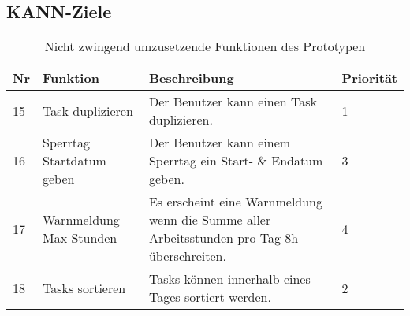 \subsection{KANN-Ziele}
\begin{table}[!ht]
\begin{center}
    \begin{tabular}{llp{6cm}l}
        \toprule Nr & Funktion & Beschreibung & Priorität \\
        \midrule 15 & Task duplizieren & Der Benutzer kann einen Task duplizieren. & 1\\
        \midrule 16 & Sperrtag Startdatum geben & Der Benutzer kann einem Sperrtag ein Start- \& Endatum geben. &  3\\ 
        \midrule 17 & Warnmeldung Max Stunden & Es erscheint eine Warnmeldung wenn die Summe aller Arbeitsstunden pro Tag 8h überschreiten. & 4\\
        \midrule 18 & Tasks sortieren & Tasks können innerhalb eines Tages sortiert werden. & 2\\
        \bottomrule
    \end{tabular}
    \caption{Nicht zwingend umzusetzende Funktionen des Prototypen}
    \label{tab:kann_funktionen}
\end{center}
\end{table}


% 
